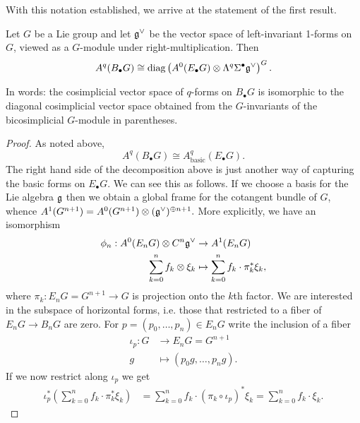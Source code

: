 \documentclass{amsart}
\DeclareMathOperator{\diag}{\text{diag}}
\begin{document}
With this notation established, we arrive at the statement of the first result.
\begin{lemma}
    Let $G$ be a Lie group and let $\mathfrak g^\vee$ be the vector space of 
    left-invariant 1-forms on $G$, viewed as a $G$-module under 
    right-multiplication. Then
    \begin{equation*}
        A^q(B_\bullet G) \cong \diag\left( A^0(E_\bullet G) \otimes 
        \Lambda^q\Sigma^\bullet\fr g^\vee\right)^G.
    \end{equation*}
\end{lemma}
In words: the cosimplicial vector space of $q$-forms on $B_\bullet G$ is 
isomorphic to the diagonal cosimplicial vector space obtained from the 
$G$-invariants of the bicosimplicial $G$-module in parentheses.
\begin{proof}
    As noted above,
    \begin{equation*}
        A^q(B_\bullet G) \cong A^q_\text{basic}(E_\bullet G).
    \end{equation*}
    The right hand side of the decomposition above is just another way of 
    capturing the basic forms on $E_\bullet G$. We can see this as follows.
    If we choose a basis for the Lie algebra $\mathfrak g$ then we obtain a global 
    frame for the cotangent bundle of $G$, whence
    $A^1(G^{n+1}) = A^0(G^{n+1})\otimes(\mathfrak g^\vee)^{\oplus n+1}.$
    More explicitly, we have an isomorphism
    \begin{align*}
        \phi_n : A^0(E_nG) \otimes C^n\mathfrak g^\vee &\to A^1(E_nG) \\
        \sum_{k=0}^n f_k \otimes \xi_k &\mapsto \sum_{k=0}^n f_k \cdot \pi_k^* 
        \xi_k,
    \end{align*}
    where $\pi_k:E_nG=G^{n+1}\to G$ is projection onto the $k$th factor.
    We are interested in the subspace of horizontal forms, i.e. those that 
    restricted to a fiber of $E_nG \to B_nG$ are zero. For $p=(p_0,\ldots, 
    p_n)\in E_nG$ write the inclusion of a fiber
    \begin{align*}
        \iota_p : G &\to E_nG=G^{n+1} \\
        g &\mapsto (p_0g, \ldots, p_ng).
    \end{align*}
    If we now restrict along $\iota_p$ we get
    \begin{align*}
        \iota_p^*\left( \sum_{k=0}^n f_k \cdot \pi_k^*\xi_k \right)
        &= \sum_{k=0}^n f_k \cdot (\pi_k\circ \iota_p)^* \xi_k
        = \sum_{k=0}^n f_k \cdot \xi_k.
    \end{align*}

\end{proof}
\end{document}
